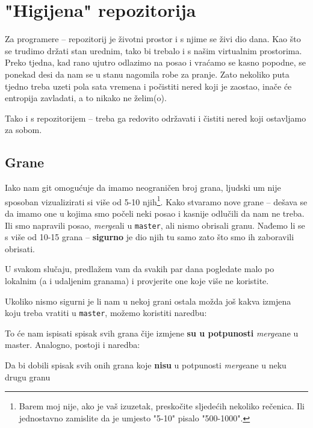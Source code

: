 \chapter*{"Higijena" repozitorija}

Za programere -- repozitorij je životni prostor i s njime se živi dio dana.
Kao što se trudimo držati stan urednim, tako bi trebalo i s našim virtualnim prostorima.
Preko tjedna, kad rano ujutro odlazimo na posao i vraćamo se kasno popodne, se ponekad desi da nam se u stanu nagomila robe za pranje.
Zato nekoliko puta tjedno treba uzeti pola sata vremena i počistiti nered koji je zaostao, inače će entropija zavladati, a to nikako ne želim(o).

Tako i s repozitorijem -- treba ga redovito održavati i čistiti nered koji ostavljamo za sobom.

\section*{Grane}

Iako nam git omogućuje da imamo neograničen broj grana, ljudski um nije sposoban vizualizirati si više od 5-10 njih\footnote{Barem moj nije, ako je vaš izuzetak, preskočite sljedećih nekoliko rečenica. Ili jednostavno zamislite da je umjesto "5-10" pisalo "500-1000".}.
Kako stvaramo nove grane -- dešava se da imamo one u kojima smo počeli neki posao i kasnije odlučili da nam ne treba.
Ili smo napravili posao, \emph{merge}ali u \verb+master+, ali nismo obrisali granu.
Nađemo li se s više od 10-15 grana -- \textbf{sigurno} je dio njih tu samo zato što smo ih zaboravili obrisati.

U svakom slučaju, predlažem vam da svakih par dana pogledate malo po lokalnim (a i udaljenim granama) i provjerite one koje više ne koristite.

Ukoliko nismo sigurni je li nam u nekoj grani ostala možda još kakva izmjena koju treba vratiti u \verb+master+, možemo koristiti naredbu:


To će nam ispisati spisak svih grana čije izmjene \textbf{su u potpunosti} \emph{merge}ane u master. 
Analogno, postoji i naredba:


Da bi dobili spisak svih onih grana koje \textbf{nisu} u potpunosti \emph{merge}ane u neku drugu granu

